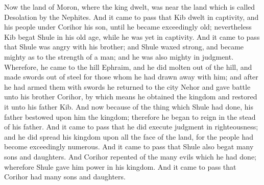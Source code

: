 Now the land of Moron, where the king dwelt, was near the land which is called Desolation by the Nephites.
\bverse \iffalse And it came to pass that Kib dwelt in captivity, and his people under Corihor his son, until he became exceedingly old; nevertheless Kib begat Shule in his old age, while he was yet in captivity. \fi
And it came to pass that Kib dwelt in captivity, and his people under Corihor his son, until he became exceedingly old; nevertheless Kib begat Shule in his old age, while he was yet in captivity.
\bverse \iffalse And it came to pass that Shule was angry with his brother; and Shule waxed strong, and became mighty as to the strength of a man; and he was also mighty in judgment. \fi
And it came to pass that Shule was angry with his brother; and Shule waxed strong, and became mighty as to the strength of a man; and he was also mighty in judgment.
\bverse \iffalse Wherefore, he came to the hill Ephraim, and he did molten out of the hill, and made swords out of steel for those whom he had drawn away with him; and after he had armed them with swords he returned to the city Nehor and gave battle unto his brother Corihor, by which means he obtained the kingdom and restored it unto his father Kib. \fi
Wherefore, he came to the hill Ephraim, and he did molten out of the hill, and made swords out of steel for those whom he had drawn away with him; and after he had armed them with swords he returned to the city Nehor and gave battle unto his brother Corihor, by which means he obtained the kingdom and restored it unto his father Kib.
\bverse \iffalse And now because of the thing which Shule had done, his father bestowed upon him the kingdom; therefore he began to reign in the stead of his father. \fi
And now because of the thing which Shule had done, his father bestowed upon him the kingdom; therefore he began to reign in the stead of his father.
\bverse \iffalse And it came to pass that he did execute judgment in righteousness; and he did spread his kingdom upon all the face of the land, for the people had become exceedingly numerous. \fi
And it came to pass that he did execute judgment in righteousness; and he did spread his kingdom upon all the face of the land, for the people had become exceedingly numerous.
\bverse \iffalse And it came to pass that Shule also begat many sons and daughters. \fi
And it came to pass that Shule also begat many sons and daughters.
\bverse \iffalse And Corihor repented of the many evils which he had done; wherefore Shule gave him power in his kingdom. \fi
And Corihor repented of the many evils which he had done; wherefore Shule gave him power in his kingdom.
\bverse \iffalse And it came to pass that Corihor had many sons and daughters. \fi
And it came to pass that Corihor had many sons and daughters.

